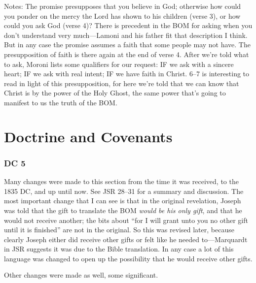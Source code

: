 		\begin{compactdesc}
		
		\item[3--5$\vert$]
		\begin{compactdesc}
		\item[Moroni's promise] Notes:
			The promise presupposes that you believe in God; otherwise how could you ponder on the mercy the Lord has shown to his children (verse 3), or how could you ask God (verse 4)?
				There is precedent in the BOM for asking when you don't understand very much---Lamoni and his father fit that description I think. But in any case the promise assumes a faith that some people may not have.
			The presupposition of faith is there again at the end of verse 4. After we're told what to ask, Moroni lists some qualifiers for our request: IF we ask with a sincere heart; IF we ask with real intent; IF we have faith in Christ.
				6--7 is interesting to read in light of this presupposition, for here we're told that we can know that Christ is by the power of the Holy Ghost, the same power that's going to manifest to us the truth of the BOM.
		\end{compactdesc}
		
		\end{compactdesc}

\section{Doctrine and Covenants} %

	\subsubsection{DC 5} %
	
		Many changes were made to this section from the time it was received, to the 1835 DC, and up until now. See JSR 28--31 for a summary and discussion. The most important change that I can see is that in the original revelation, Joseph was told that the gift to translate the BOM \textit{would be his only gift}, and that he would not receive another; the bits about ``for I will grant unto you no other gift until it is finished'' are not in the original. So this was revised later, because clearly Joseph either did receive other gifts or felt like he needed to---Marquardt in JSR suggests it was due to the Bible translation. In any case a lot of this language was changed to open up the possibility that he would receive other gifts.
		
		Other changes were made as well, some significant.
		
